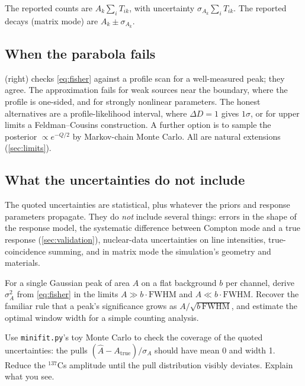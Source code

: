 \documentclass[11pt]{article}
\newcounter{exercise}[section]
\newcommand{\code}[1]{\texttt{#1}}
\newcommand{\nuc}[2]{${}^{#1}$#2}
\begin{document}
The reported counts are $A_k\sum_iT_{ik}$, with uncertainty $\sigma_{A_k}\sum_iT_{ik}$. The reported decays (matrix mode) are $A_k\pm\sigma_{A_k}$.

\subsection{When the parabola fails}
 (right) checks \cref{eq:fisher} against a profile scan for a well-measured peak; they agree. The approximation fails for weak sources near the boundary, where the profile is one-sided, and for strongly nonlinear parameters. The honest alternatives are a profile-likelihood interval, where $\Delta D = 1$ gives $1\sigma$, or for upper limits a Feldman--Cousins construction. A further option is to sample the posterior $\propto e^{-Q/2}$ by Markov-chain Monte Carlo. All are natural extensions (\cref{sec:limits}).

\subsection{What the uncertainties do not include}
The quoted uncertainties are statistical, plus whatever the priors and response parameters propagate. They do \emph{not} include several things: errors in the shape of the response model, the systematic difference between Compton mode and a true response (\cref{sec:validation}), nuclear-data uncertainties on line intensities, true-coincidence summing, and in matrix mode the simulation's geometry and materials.

\begin{exercise}[A]
For a single Gaussian peak of area $A$ on a flat background $b$ per channel, derive $\sigma_A^2$ from \cref{eq:fisher} in the limits $A\gg b\cdot\mathrm{FWHM}$ and $A\ll b\cdot\mathrm{FWHM}$. Recover the familiar rule that a peak's significance grows as $A/\sqrt{b\,\mathrm{FWHM}}$, and estimate the optimal window width for a simple counting analysis.
\end{exercise}

\begin{exercise}[P]
Use \code{minifit.py}'s toy Monte Carlo to check the coverage of the quoted uncertainties: the pulls $(\hat A-A_\text{true})/\sigma_A$ should have mean 0 and width 1. Reduce the \nuc{137}{Cs} amplitude until the pull distribution visibly deviates. Explain what you see.
\end{exercise}

\end{document}
